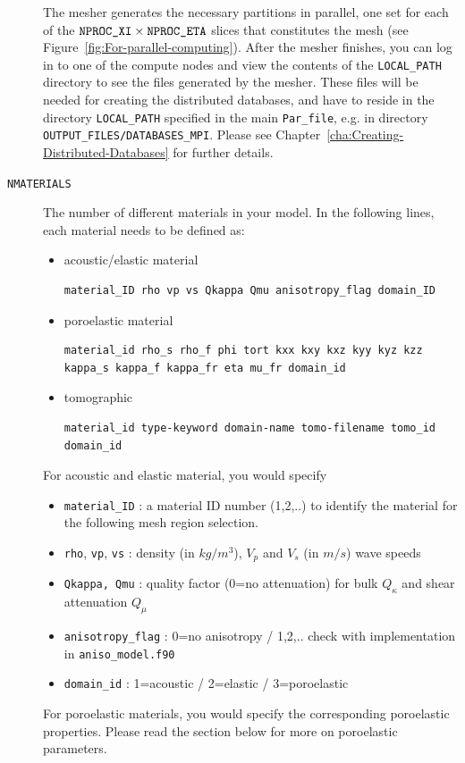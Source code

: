 \begin{description}
The mesher generates the necessary partitions in parallel, one set
for each of the $\mbox{\texttt{NPROC\_XI\/}}\times\mbox{\texttt{NPROC\_ETA\/}}$ slices that constitutes
the mesh (see Figure~\ref{fig:For-parallel-computing}). After the
mesher finishes, you can log in to one of the compute nodes and view
the contents of the \texttt{LOCAL\_PATH} directory to see the files
generated by the mesher. These files will be needed for creating the
distributed databases, and have to reside in the directory \texttt{LOCAL\_PATH}
specified in the main \texttt{Par\_file}, e.g. in directory \texttt{OUTPUT\_FILES/DATABASES\_MPI}.
Please see Chapter~\ref{cha:Creating-Distributed-Databases} for
further details.
%
\item [{\texttt{NMATERIALS}}] The number of different materials in your
model. In the following lines, each material needs to be defined as:
%
\begin{itemize}[leftmargin=-8ex,itemindent=8ex]
\item[] acoustic/elastic material
{\small
\begin{verbatim}
material_ID rho vp vs Qkappa Qmu anisotropy_flag domain_ID
\end{verbatim}
}
\item[] poroelastic material
{\small
\begin{verbatim}
material_id rho_s rho_f phi tort kxx kxy kxz kyy kyz kzz kappa_s kappa_f kappa_fr eta mu_fr domain_id
\end{verbatim}
}
\item[] tomographic
{\small
\begin{verbatim}
material_id type-keyword domain-name tomo-filename tomo_id domain_id
\end{verbatim}
}
\end{itemize}
For acoustic and elastic material, you would specify
\begin{itemize}
\item \texttt{material\_ID} : a material ID number (1,2,..) to identify the material for the following mesh region selection.
\item \texttt{rho}, \texttt{vp}, \texttt{vs} : density (in $kg/m^3$), $V_p$ and $V_s$ (in $m/s$) wave speeds
\item \texttt{Qkappa, Qmu} : quality factor (0=no attenuation) for bulk $Q_{\kappa}$ and shear attenuation $Q_{\mu}$
\item \texttt{anisotropy\_flag} : 0=no anisotropy / 1,2,.. check with implementation
in \texttt{aniso\_model.f90}
\item \texttt{domain\_id} : 1=acoustic / 2=elastic / 3=poroelastic
\end{itemize}
\noindent
For poroelastic materials, you would specify the corresponding poroelastic properties.
Please read the section below for more on poroelastic parameters.\\


\end{description}
